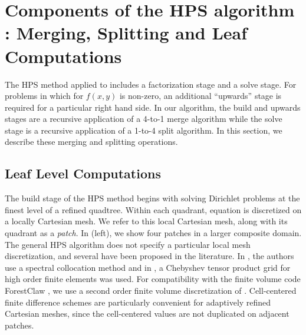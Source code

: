 \section{Components of the HPS algorithm : Merging, Splitting and Leaf Computations}
\label{sec:quadtree}
The HPS method applied to  includes a factorization stage and a solve stage. For problems in which for $f(x,y)$ is non-zero, an additional ``upwards'' stage is required for a particular right hand side.  In our algorithm, the build and upwards stages are a recursive application of a 4-to-1 merge algorithm while the solve stage is a recursive application of a 1-to-4 split algorithm.  In this section, we describe these merging and splitting operations.


\subsection{Leaf Level Computations}
\label{sub:leaf_level_computations}

The build stage of the HPS method begins with solving Dirichlet problems at the finest level of a refined quadtree.  Within each quadrant, equation  is discretized on a locally Cartesian mesh.  We refer to this local Cartesian mesh, along with its quadrant as a {\em patch}.  In  (left), we show four patches in a larger composite domain. The general HPS algorithm does not specify a particular local mesh discretization, and several have been proposed in the literature.  In \citep{gillman2014direct}, the authors use a spectral collocation method and in \citep{fortunato2020ultraspherical}, a Chebyshev tensor product grid for high order finite elements was used. For compatibility with the finite volume code ForestClaw \citep{calhoun2017forestclaw}, we use a second order finite volume discretization of . Cell-centered finite difference schemes are particularly convenient for adaptively refined Cartesian meshes, since the cell-centered values are not duplicated on adjacent patches.

